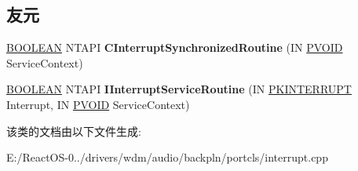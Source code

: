 \subsection*{友元}
\begin{DoxyCompactItemize}
\item 
\mbox{\label{class_c_interrupt_sync_ab0cce03abe2c59ea7c246f22259291f3}} 
\hyperlink{_processor_bind_8h_a112e3146cb38b6ee95e64d85842e380a}{B\+O\+O\+L\+E\+AN} N\+T\+A\+PI {\bfseries C\+Interrupt\+Synchronized\+Routine} (IN \hyperlink{interfacevoid}{P\+V\+O\+ID} Service\+Context)
\item 
\mbox{\label{class_c_interrupt_sync_af6feb10dd0c9062e1e89da8c92015dc7}} 
\hyperlink{_processor_bind_8h_a112e3146cb38b6ee95e64d85842e380a}{B\+O\+O\+L\+E\+AN} N\+T\+A\+PI {\bfseries I\+Interrupt\+Service\+Routine} (IN \hyperlink{struct___k_i_n_t_e_r_r_u_p_t}{P\+K\+I\+N\+T\+E\+R\+R\+U\+PT} Interrupt, IN \hyperlink{interfacevoid}{P\+V\+O\+ID} Service\+Context)
\end{DoxyCompactItemize}


该类的文档由以下文件生成\+:\begin{DoxyCompactItemize}
\item 
E\+:/\+React\+O\+S-\/0../drivers/wdm/audio/backpln/portcls/interrupt.\+cpp\end{DoxyCompactItemize}
